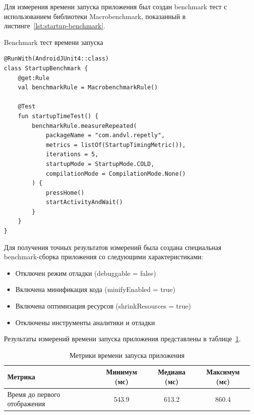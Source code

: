 \documentclass[14pt, russian]{scrartcl}
\begin{document}
Для измерения времени запуска приложения был создан benchmark тест с использованием библиотеки Macrobenchmark, показанный в листинге~\ref{lst:startup-benchmark}.

\begin{listing}[!htb]
\caption{Benchmark тест времени запуска}
\vspace{-0.3cm}
\label{lst:startup-benchmark}
\begin{verbatim}
@RunWith(AndroidJUnit4::class)
class StartupBenchmark {
    @get:Rule
    val benchmarkRule = MacrobenchmarkRule()

    @Test
    fun startupTimeTest() {
        benchmarkRule.measureRepeated(
            packageName = "com.andvl.repetly",
            metrics = listOf(StartupTimingMetric()),
            iterations = 5,
            startupMode = StartupMode.COLD,
            compilationMode = CompilationMode.None()
        ) {
            pressHome()
            startActivityAndWait()
        }
    }
}
\end{verbatim}
\end{listing}

Для получения точных результатов измерений была создана специальная benchmark-сборка приложения со следующими характеристиками:
\begin{itemize}
\item Отключен режим отладки (debuggable = false)
\item Включена минификация кода (minifyEnabled = true)
\item Включена оптимизация ресурсов (shrinkResources = true)
\item Отключены инструменты аналитики и отладки
\end{itemize}

Результаты измерений времени запуска приложения представлены в таблице~\ref{tab:startup-metrics}.

\begin{table}[!htb]
\caption{Метрики времени запуска приложения}
\vspace{-0.3cm}
\label{tab:startup-metrics}
\begin{center}
\begin{tabular}{|l|c|c|c|}
\hline
\textbf{Метрика} & \textbf{Минимум (мс)} & \textbf{Медиана (мс)} & \textbf{Максимум (мс)} \\
\hline
Время до первого отображения & 543.9 & 613.2 & 860.4 \\
\hline
\end{tabular}
\end{center}
\end{table}
\end{document}

